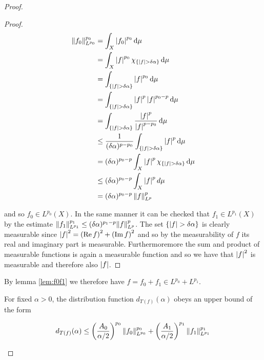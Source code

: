 \begin{proof}
\begin{proof}
\begin{equation*}
	\begin{aligned}
		\norm[0]{f_0}^{p_0}_{L^{p_0}} &= \int_{X} \abs[0]{ f_0}^{p_0} \d\mu\\
		&=\int_{X} \abs[0]{ f }^{p_0} \chi_{\cbr[0]{ \abs[0]{f} > \delta\alpha}} \d\mu\\
		&= \int_{\cbr[0]{\abs[0]{ f } > \delta\alpha }} \abs[0]{ f}^{p_0}\d\mu\\ 
		&= \int_{\cbr[0]{\abs[0]{ f} > \delta\alpha }} \abs[0]{ f }^p \abs[0]{ f }^{p_0 - p} \d\mu\\
		&= \int_{\cbr[0]{\abs[0]{ f} > \delta\alpha }} \frac{\abs[0]{ f}^p}{\abs[0]{ f}^{p - p_0}} \d\mu\\
		&\leq \frac{1}{(\delta\alpha)^{p - p_0}} \int_{\cbr[0]{\abs[0]{ f} > \delta\alpha }} \abs[0]{ f}^p \d\mu\\
		&= (\delta\alpha)^{p_0 - p} \int_{X} \abs[0]{ f }^p \chi_{\cbr[0]{\abs[0]{ f} > \delta\alpha }} \d\mu\\
		& \leq (\delta\alpha)^{p_0 - p} \int_{X} \abs[0]{ f }^p d\mu\\
		&= (\delta\alpha)^{p_0 - p} \norm[0]{f}^p_{L^p}
	\end{aligned}
\end{equation*}

\noindent and so $f_0 \in L^{p_0}(X)$. In the same manner it can be checked that $f_1 \in L^{p_1}(X)$ by the estimate $\norm[0]{f_1}^{p_1}_{L^{p_1}} \leq (\delta\alpha)^{p_1 - p}\norm{f}_{L^p}^p$. The set $\cbr[0]{\abs[0]{f} > \delta\alpha}$ is clearly measurable since $\abs[0]{f}^2 = \del[0]{\Re f}^2 + \del[0]{\Im f}^2$ and so by the measurability of $f$ its real and imaginary part is measurable. Furthermoremore the sum and product of measurable functions is again a measurable function and so we have that $\abs[0]{f}^2$ is measurable and therefore also $\abs[0]{f}$.
\end{proof}

By lemma \ref{lem:f0f1} we therefore have $f = f_0 + f_1 \in L^{p_0} + L^{p_1}$. 

\begin{lemma}
	For fixed $\alpha > 0$, the distribution function $d_{T(f)}(\alpha)$ obeys an upper bound of the form

	\begin{equation*}
		d_{T(f)}(\alpha) \leq  \del{\frac{A_0}{\alpha/2}}^{p_0} \norm[0]{f_0}^{p_0}_{L^{p_0}} + \del{\frac{A_1}{\alpha/2}}^{p_1} \norm[0]{f_1}^{p_1}_{L^{p_1}}
	\end{equation*}
\end{lemma}


\end{proof}
